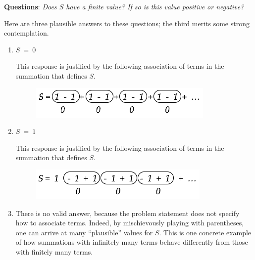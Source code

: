 \noindent
{\bf Questions}:  {\it Does $S$ have a finite value?  If so is this value
positive or negative?}

\noindent
Here are three plausible answers to these questions; the third merits
some strong contemplation.
\begin{enumerate}
\item
$S \ = \ 0$

This response is justified by the following association of terms in
the summation that defines $S$.
\begin{figure}[h]
\begin{center}
        \includegraphics[scale=0.5]{FiguresArithmetic/InfiniteParadox1}
\end{center}
\end{figure}

\item
$S \ = \ 1$

This response is justified by the following association of terms in the
summation that defines $S$.
\begin{figure}[h]
\begin{center}
        \includegraphics[scale=0.5]{FiguresArithmetic/InfiniteParadox2}
\end{center}
\end{figure}

\item
There is no valid answer, because the problem statement does not
specify how to associate terms.  Indeed, by mischievously playing with
parentheses, one can arrive at many ``plausible'' values for $S$.
This is one concrete example of how summations with infinitely many
terms behave differently from those with finitely many terms.
\end{enumerate}


